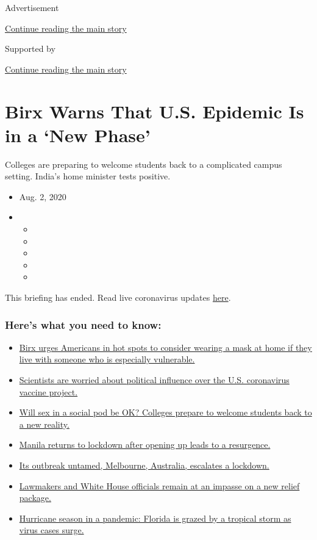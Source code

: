 Advertisement

\protect\hyperlink{after-top}{Continue reading the main story}

Supported by

\protect\hyperlink{after-sponsor}{Continue reading the main story}

\hypertarget{birx-warns-that-us-epidemic-is-in-a-new-phase}{%
\section{Birx Warns That U.S. Epidemic Is in a `New
Phase'}\label{birx-warns-that-us-epidemic-is-in-a-new-phase}}

Colleges are preparing to welcome students back to a complicated campus
setting. India's home minister tests positive.

\begin{itemize}
\item
  Aug. 2, 2020
\item
  \begin{itemize}
  \item
  \item
  \item
  \item
  \item
  \end{itemize}
\end{itemize}

This briefing has ended. Read live coronavirus updates
\href{https://www.nytimes.com/2020/08/03/world/coronavirus-covid-19.html}{here}.

\hypertarget{heres-what-you-need-to-know}{%
\subsubsection{Here's what you need to
know:}\label{heres-what-you-need-to-know}}

\begin{itemize}
\tightlist
\item
  \protect\hyperlink{link-4c637647}{Birx urges Americans in hot spots to
  consider wearing a mask at home if they live with someone who is
  especially vulnerable.}
\item
  \protect\hyperlink{link-18bff79b}{Scientists are worried about
  political influence over the U.S. coronavirus vaccine project.}
\item
  \protect\hyperlink{link-79292e3}{Will sex in a social pod be OK?
  Colleges prepare to welcome students back to a new reality.}
\item
  \protect\hyperlink{link-41ce99eb}{Manila returns to lockdown after
  opening up leads to a resurgence.}
\item
  \protect\hyperlink{link-74f9a2b2}{Its outbreak untamed, Melbourne,
  Australia, escalates a lockdown.}
\item
  \protect\hyperlink{link-1a62dbb2}{Lawmakers and White House officials
  remain at an impasse on a new relief package.}
\item
  \protect\hyperlink{link-479653b6}{Hurricane season in a pandemic:
  Florida is grazed by a tropical storm as virus cases surge.}
\end{itemize}

